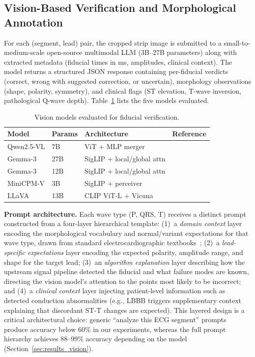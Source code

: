 \documentclass[journal,compsoc]{IEEEtran}
\begin{document}
\subsection{Vision-Based Verification and Morphological Annotation}
\label{sec:vision}

For each (segment, lead) pair, the cropped strip image is submitted to a small-to-medium-scale open-source multimodal LLM (3B--27B parameters) along with extracted metadata (fiducial times in ms, amplitudes, clinical context). The model returns a structured JSON response containing per-fiducial verdicts (correct, wrong with suggested correction, or uncertain), morphology observations (shape, polarity, symmetry), and clinical flags (ST elevation, T-wave inversion, pathological Q-wave depth). Table~\ref{tab:models} lists the five models evaluated.

\begin{table}[t]
\centering
\caption{Vision models evaluated for fiducial verification.}
\label{tab:models}
\begin{tabular}{llll}
\toprule
Model & Params & Architecture & Reference \\
\midrule
Qwen2.5-VL & 7B & ViT + MLP merger & \cite{qwen25vl2025} \\
Gemma-3 & 27B & SigLIP + local/global attn & \cite{gemma3_2025} \\
Gemma-3 & 12B & SigLIP + local/global attn & \cite{gemma3_2025} \\
MiniCPM-V & 3B & SigLIP + perceiver & \cite{minicpmv2024} \\
LLaVA & 13B & CLIP ViT-L + Vicuna & \cite{llavamed2023} \\
\bottomrule
\end{tabular}
\end{table}

\textbf{Prompt architecture.} Each wave type (P, QRS, T) receives a distinct prompt constructed from a four-layer hierarchical template: (1)~a \emph{domain context} layer encoding the morphological vocabulary and normal/variant expectations for that wave type, drawn from standard electrocardiographic textbooks~\cite{goldberger2017clinical,marriott2019practical}; (2)~a \emph{lead-specific expectations} layer encoding the expected polarity, amplitude range, and shape for the target lead; (3)~an \emph{algorithm explanation} layer describing how the upstream signal pipeline detected the fiducial and what failure modes are known, directing the vision model's attention to the points most likely to be incorrect; and (4)~a \emph{clinical context} layer injecting patient-level information such as detected conduction abnormalities (e.g., LBBB triggers supplementary context explaining that discordant ST-T changes are expected). This layered design is a critical architectural choice: generic ``analyze this ECG segment'' prompts produce accuracy below 60\% in our experiments, whereas the full prompt hierarchy achieves 88--99\% accuracy depending on the model (Section~\ref{sec:results_vision}).
\end{document}
